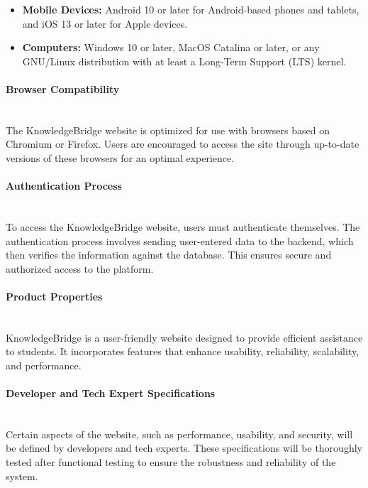 \documentclass[12pt,a4paper]{article}
\begin{document}
\begin{spacing}{1.5}
    \begin{itemize}
        \item \textbf{Mobile Devices:} Android 10 or later for Android-based phones and tablets, and iOS 13 or later for Apple devices.
        \item \textbf{Computers:} Windows 10 or later, MacOS Catalina or later, or any GNU/Linux distribution with at least a Long-Term Support (LTS) kernel.
    \end{itemize}

    \paragraph{Browser Compatibility} \mbox{} \\ \indent
    The KnowledgeBridge website is optimized for use with browsers based on Chromium or Firefox. Users are encouraged to access the site through up-to-date versions of these browsers for an optimal experience.

    \paragraph{Authentication Process} \mbox{} \\ \indent
    To access the KnowledgeBridge website, users must authenticate themselves. The authentication process involves sending user-entered data to the backend, which then verifies the information against the database. This ensures secure and authorized access to the platform.

    \paragraph{Product Properties} \mbox{} \\ \indent
    KnowledgeBridge is a user-friendly website designed to provide efficient assistance to students. It incorporates features that enhance usability, reliability, scalability, and performance.

    \paragraph{Developer and Tech Expert Specifications} \mbox{} \\ \indent
    Certain aspects of the website, such as performance, usability, and security, will be defined by developers and tech experts. These specifications will be thoroughly tested after functional testing to ensure the robustness and reliability of the system.


\end{spacing}
\end{document}
